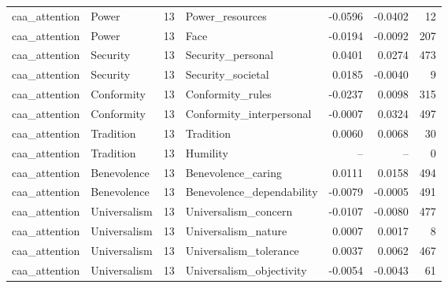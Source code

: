 \begin{tabular}{llrlrrr}
caa\_attention & Power & 13 & Power\_resources & -0.0596 & -0.0402 & 12 \\
caa\_attention & Power & 13 & Face & -0.0194 & -0.0092 & 207 \\
caa\_attention & Security & 13 & Security\_personal & 0.0401 & 0.0274 & 473 \\
caa\_attention & Security & 13 & Security\_societal & 0.0185 & -0.0040 & 9 \\
caa\_attention & Conformity & 13 & Conformity\_rules & -0.0237 & 0.0098 & 315 \\
caa\_attention & Conformity & 13 & Conformity\_interpersonal & -0.0007 & 0.0324 & 497 \\
caa\_attention & Tradition & 13 & Tradition & 0.0060 & 0.0068 & 30 \\
caa\_attention & Tradition & 13 & Humility & -- & -- & 0 \\
caa\_attention & Benevolence & 13 & Benevolence\_caring & 0.0111 & 0.0158 & 494 \\
caa\_attention & Benevolence & 13 & Benevolence\_dependability & -0.0079 & -0.0005 & 491 \\
caa\_attention & Universalism & 13 & Universalism\_concern & -0.0107 & -0.0080 & 477 \\
caa\_attention & Universalism & 13 & Universalism\_nature & 0.0007 & 0.0017 & 8 \\
caa\_attention & Universalism & 13 & Universalism\_tolerance & 0.0037 & 0.0062 & 467 \\
caa\_attention & Universalism & 13 & Universalism\_objectivity & -0.0054 & -0.0043 & 61 \\
\bottomrule
\end{tabular}
